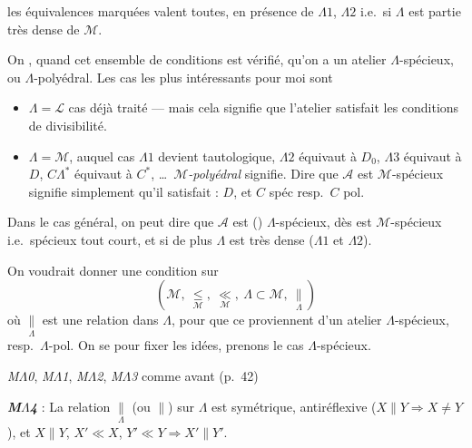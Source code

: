 \documentclass[11pt,a4paper]{article}
\begin{document}
les équivalences marquées valent toutes, en présence de $\Lambda 1$, $\Lambda 2$ i.e.\ si $\Lambda$ est partie très dense de $\mathcal{M}$.


On , quand cet ensemble de conditions est vérifié, qu'on a un atelier $\Lambda$-spécieux, ou $\Lambda$-polyédral. Les cas les plus intéressants pour moi sont
\begin{itemize}
  \item[1°)] $\Lambda = \mathcal{L}$ cas déjà traité — mais cela signifie que l'atelier satisfait  les conditions de divisibilité.
  \item[2°)] $\Lambda = \mathcal{M}$, auquel cas $\Lambda 1$ devient tautologique, $\Lambda 2$ équivaut à $D_0$, $\Lambda 3$ équivaut à $D$, $C\Lambda^{*}$ équivaut à $C^{*}$,  \ldots\ \emph{$\mathcal{M}$-polyédral} signifie. Dire que $\mathcal{A}$ est $\mathcal{M}$-spécieux signifie simplement qu'il satisfait : $D$, et $C$ spéc resp.\ $C$ pol.
\end{itemize}

Dans le cas général, on peut dire que $\mathcal{A}$ est () $\Lambda$-spécieux, dès  est $\mathcal{M}$-spécieux i.e.\ spécieux tout court, et si de plus $\Lambda$ est très dense ($\Lambda 1$ et $\Lambda 2$).

On voudrait donner une condition sur
\[
  (\mathcal{M},\ \underset{\mathcal{M}}{\leq},\ \underset{\mathcal{M}}{\ll},\ \Lambda \subset \mathcal{M},\ \underset{\Lambda}{\parallel})
\]
où $\underset{\Lambda}{\parallel}$ est une relation dans $\Lambda$,  pour que ce proviennent d'un atelier $\Lambda$-spécieux, resp.\ $\Lambda$-pol. On se  pour fixer les idées, prenons le cas $\Lambda$-spécieux.

\emph{M$\Lambda$0}, \emph{M$\Lambda$1}, \emph{M$\Lambda$2}, \emph{M$\Lambda$3} comme avant (p.~42)

\textbf{\emph{M$\Lambda$4}} : La relation $\underset{\Lambda}{\parallel}$ (ou $\parallel$) sur $\Lambda$ est  symétrique, antiréflexive ($X \parallel Y \Rightarrow X \neq Y$), et $X \parallel Y$, $X' \ll X$, $Y' \ll Y \Longrightarrow X' \parallel Y'$.
\end{document}
